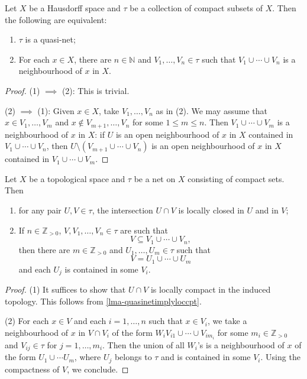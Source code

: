 \begin{lemma}
    Let $X$ be a Hausdorff space and $\tau$ be a collection of compact subsets of $X$. Then the following are equivalent:
    \begin{enumerate}
        \item $\tau$ is a quasi-net;
        \item For each $x\in X$, there are $n\in \mathbb{N}$ and $V_1,\ldots,V_n\in \tau$ such that $V_1\cup\cdots\cup V_n$ is a neighbourhood of $x$ in $X$.
    \end{enumerate}
\end{lemma}
\begin{proof}
    (1) $\implies$ (2): This is trivial.

    (2) $\implies$ (1): Given $x\in X$, take $V_1,\ldots,V_n$ as in (2). We may assume that $x\in V_1,\ldots,V_m$ and $x\not\in V_{m+1},\ldots,V_n$ for some $1\leq m\leq n$. Then $V_1\cup\cdots\cup V_m$ is a neighbourhood of $x$ in $X$: if $U$ is an open neighbourhood of $x$ in $X$ contained in $V_1\cup \cdots\cup V_n$, then $U\setminus (V_{m+1}\cup\cdots \cup V_n)$ is an open neighbourhood of $x$ in $X$ contained in $V_1\cup\cdots\cup V_m$.
\end{proof}

\begin{lemma}\label{lma-netproperty1}
    Let $X$ be a topological space and $\tau$ be a net on $X$ consisting of compact sets. Then
    \begin{enumerate}
        \item for any pair $U,V\in \tau$, the intersection $U\cap V$ is locally closed in $U$ and in $V$;
        \item If $n\in \mathbb{Z}_{>0}$, $V,V_1,\ldots,V_n\in \tau$ are such that 
            \[
                V\subseteq V_1\cup \cdots\cup V_n,
            \]
            then there are $m\in \mathbb{Z}_{>0}$ and $U_1,\ldots,U_m\in \tau$ such that 
            \[
                V=U_1\cup\cdots\cup U_m  
            \]
            and each $U_j$ is contained in some $V_i$.
    \end{enumerate}
\end{lemma}
\begin{proof}
    (1) It suffices to show that $U\cap V$ is locally compact in the induced topology. This follows from \cref{lma-quasinetimplyloccpt}.
    
    (2) For each $x\in V$ and each $i=1,\ldots,n$ such that $x\in V_i$, we take a neighbourhood of $x$ in $V\cap V_i$ of the form $W_iV_{i1}\cup\cdots\cup V_{im_i}$ for some $m_i\in \mathbb{Z}_{>0}$ and $V_{ij}\in \tau$ for $j=1,\ldots,m_i$. Then the union of all $W_i$'s is a neighbourhood of $x$ of the form $U_1\cup \cdots U_m$, where $U_j$ belongs to $\tau$ and is contained in some $V_i$. Using the compactness of $V$, we conclude.
\end{proof}

